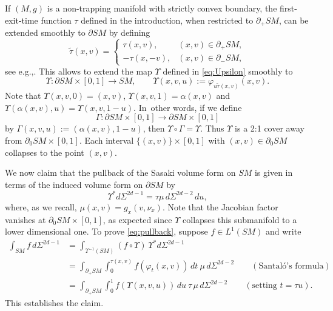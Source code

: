 \documentclass[11pt]{article}
\newcommand{\eg}{e.g.,\xspace}
\theoremstyle{plain}
\theoremstyle{definition}
\theoremstyle{remark}
\def\t{\tilde{\tau}}
\newcommand{\del}{\partial}
\begin{document}
If $(M,g)$ is a non-trapping manifold with strictly convex boundary, the first-exit-time function $\tau$ defined in the introduction, when restricted to $\partial_+ SM$, can be extended smoothly to $\partial SM$ by defining
\begin{equation}
\tilde{\tau}(x,v)=
\begin{cases}
\tau(x,v), &(x,v)\in\partial_{+}SM,\\
-\tau(x,-v), &(x,v)\in\partial_{-}SM,
\end{cases}
\label{eq:ttau}
\end{equation}
see \eg \cite[Lem.\,3.2.6]{Paternain2021}. This allows to extend the map $\Upsilon$ defined in \eqref{eq:Upsilon} smoothly to
\[
\Upsilon:\partial SM\times [0,1]\to SM, \qquad \Upsilon(x,v,u):=\varphi_{u\t(x,v)}(x,v).
\]
Note that $\Upsilon(x,v,0)=(x,v)$, $\Upsilon(x,v,1)=\alpha(x,v)$
and \hbox{$\Upsilon(\alpha(x,v),u)=\Upsilon(x,v,1-u)$}. In~other words, if we define
\[
\Gamma:\partial SM\times [0,1]\to\partial SM \times [0,1]
\]
by
$\Gamma(x,v,u):=(\alpha(x,v),1-u)$, then $\Upsilon\circ \Gamma=\Upsilon$.
Thus $\Upsilon$ is a 2:1 cover away from $\partial_0 SM\times[0,1]$. Each interval $\{(x,v)\} \times [0,1]$
with $(x,v) \in \del_0 SM$ collapses to the point $(x,v)$.

We now claim that the pullback of the Sasaki volume form on $SM$ is given in terms of the induced volume form on $\partial SM$ by
\begin{equation}
\Upsilon^* d\Sigma^{2d-1} = \tau\mu\,d\Sigma^{2d-2}\,du,
\label{eq:pullback}
\end{equation}
where, as we recall, $\mu(x,v) = g_x(v, \nu_x)$. Note that the Jacobian factor vanishes at $\partial_0 SM \times [0,1]$, as expected
since $\Upsilon$ collapses this submanifold to a lower dimensional one. To prove \eqref{eq:pullback}, suppose $f\in L^1(SM)$ and write\vspace*{-3pt}
\begin{align*}
\int_{SM} f\,d\Sigma^{2d-1} &= \int_{\Upsilon^{-1} (SM)} (f\circ \Upsilon)\ \Upsilon^* d\Sigma^{2d-1}\\
&= \int_{\partial_+ SM} \int_0^{\tau(x,v)} f(\varphi_t(x,v))\,dt\ \mu \, d\Sigma^{2d-2} \qquad (\text{Santaló's formula}) \\
&
= \int_{\partial_+ SM} \int_0^1 f(\Upsilon(x,v,u)) \,du\ \tau \, \mu \, d\Sigma^{2d-2} \qquad (\text{setting } t = \tau u).
\end{align*}
This establishes the claim.
\end{document}
